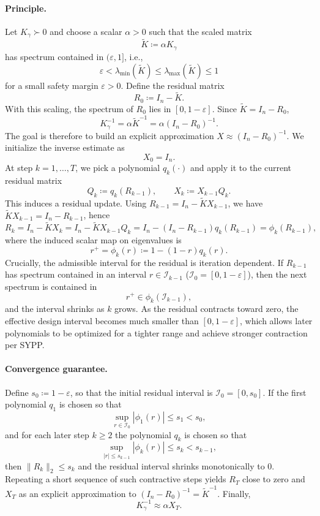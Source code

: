 \documentclass[11pt]{article}
\begin{document}
\paragraph{Principle.}
Let ${K}_\gamma\succ 0$ and choose a scalar $\alpha>0$ such that the scaled matrix
\[
\widetilde{{K}}  \coloneqq  \alpha {K}_\gamma
\]
has spectrum contained in $(\varepsilon, 1]$, i.e.,
\[
\varepsilon  <  \lambda_{\min}(\widetilde{{K}})  \le  \lambda_{\max}(\widetilde{{K}})  \le  1
\]
for a small safety margin $\varepsilon>0$. Define the residual matrix
\[
{R}_0  \coloneqq  {I}_n-\widetilde{{K}}.
\]
With this scaling, the spectrum of ${R}_0$ lies in $[0, 1-\varepsilon]$. Since
$\widetilde{{K}}={I}_n-{R}_0$,
\[
{K}_\gamma^{-1} = \alpha \widetilde{{K}}^{-1}
 = \alpha ({I}_n-{R}_0)^{-1}.
\]
The goal is therefore to build an explicit approximation ${X}\approx({I}_n-{R}_0)^{-1}$.
We initialize the inverse estimate as
\[
{X}_0 = {I}_n.
\]
At step $k=1,\dots,T$, we pick a polynomial $q_k(\cdot)$ and apply it to the current residual matrix
\[
{Q}_k  \coloneqq  q_k({R}_{k-1}),
\qquad
{X}_k \coloneqq {X}_{k-1} {Q}_k.
\]
This induces a residual update. Using ${R}_{k-1}={I}_n-\widetilde{{K}}{X}_{k-1}$, we have
$\widetilde{{K}}{X}_{k-1}={I}_n-{R}_{k-1}$, hence
\[
{R}_k
 = 
{I}_n-\widetilde{{K}}{X}_k
 = 
{I}_n-\widetilde{{K}}{X}_{k-1} {Q}_k
 = 
{I}_n-({I}_n-{R}_{k-1}) q_k({R}_{k-1})
 = 
\phi_k({R}_{k-1}),
\]
where the induced scalar map on eigenvalues is
\[
r^{+} = \phi_k(r) \coloneqq 1-(1-r) q_k(r).
\]
Crucially, the admissible interval for the residual is iteration dependent. If ${R}_{k-1}$ has spectrum contained
in an interval $r\in\mathcal{I}_{k-1}$ ($\mathcal{I}_0=[0, 1-\varepsilon]$), then the next spectrum is contained in
\[
r^{+}\in \phi_k(\mathcal{I}_{k-1}),
\]
and the interval shrinks as $k$ grows. As the residual contracts toward zero, the effective design interval becomes much
smaller than $[0, 1-\varepsilon]$, which allows later polynomials to be optimized for a tighter range and achieve stronger
contraction per SYPP.

\paragraph{Convergence guarantee.}
Define $s_0\coloneqq 1-\varepsilon$, so that the initial residual interval is $\mathcal{I}_0=[0,s_0]$. If the first polynomial $q_1$ is chosen so that
\[
\sup_{r\in \mathcal{I}_0} |\phi_1(r)|  \le  s_1  <  s_0,
\]
and for each later step $k\ge 2$ the polynomial $q_k$ is chosen so that
\[
\sup_{|r|\le s_{k-1}} |\phi_k(r)|  \le  s_k  <  s_{k-1},
\]
then $\|{R}_k\|_2\le s_k$ and the residual interval shrinks monotonically to $0$. Repeating a short
sequence of such contractive steps yields ${R}_T$ close to zero and ${X}_T$ as an explicit
approximation to $({I}_n-{R}_0)^{-1}=\widetilde{{K}}^{-1}$. Finally,
\[
{K}_\gamma^{-1} \approx \alpha {X}_T.
\]
\end{document}
